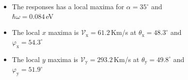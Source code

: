 \documentclass{beamer}
\begin{document}
\begin{frame}

\begin{columns}


{\small

\vspace{-2mm}
\begin{itemize}

\item The responses has a local maxima for $\alpha = 35^{\circ}$ and $\hbar
\omega = 0.084$\,eV

\item The local $x$ maxima is 
$\mathcal{V}_{\mathrm{x}} = 61.2$\,Km/s at
$\theta_{\mathrm{x}} = 48.3^{\circ}$ and
$\varphi_{\mathrm{x}} = 54.3^{\circ}$

\item The local $y$ maxima is 
$\mathcal{V}_{\mathrm{y}} = 293.2$\,Km/s at 
$\theta_{\mathrm{y}} =49.8^{\circ}$ and
$\varphi_{\mathrm{y}} = 51.9^{\circ}$

\end{itemize}

}

\begin{center}

\vspace{-8mm}
\begin{figure}[h!]
\end{figure}
\end{center}
\end{columns}
\end{frame}
\end{document}
